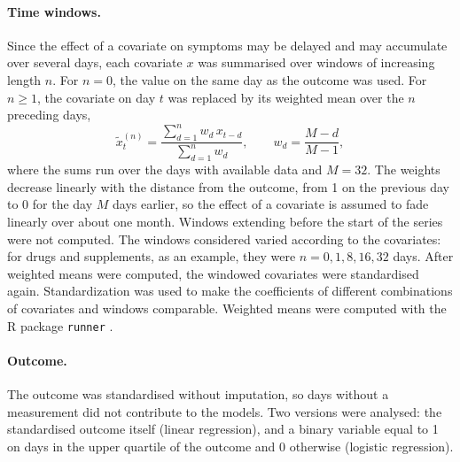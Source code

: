 \documentclass[11pt,a4paper]{article}
\begin{document}
\paragraph{Time windows.}
Since the effect of a covariate on symptoms may be delayed and may accumulate over
several days, each covariate $x$ was summarised over windows of increasing length
$n$. For $n=0$, the value on the same day as the outcome was used. For $n \geq 1$, the
covariate on day $t$ was replaced by its weighted mean over the $n$ preceding days,
\begin{equation}
  \tilde{x}^{(n)}_t = \frac{\sum_{d=1}^{n} w_d\, x_{t-d}}{\sum_{d=1}^{n} w_d},
  \qquad w_d = \frac{M-d}{M-1},
\end{equation}
where the sums run over the days with available data and $M = 32$. The weights
decrease linearly with the distance from the outcome, from 1 on the previous day to 0
for the day $M$ days earlier, so the effect of a covariate is assumed to fade linearly
over about one month. Windows extending before the start of the series were not
computed. The windows considered varied according to the covariates: for drugs and supplements, 
as an example, they were $n = 0, 1, 8, 16, 32$ days. After weighted means were computed,
the windowed covariates were standardised again. Standardization was used to make
the coefficients of different combinations of covariates and windows comparable. 
Weighted means were computed with the R package \texttt{runner} \citep{runner}.

\paragraph{Outcome.}
The outcome was standardised without imputation, so days without a measurement did
not contribute to the models. Two versions were analysed: the standardised outcome
itself (linear regression), and a binary variable equal to 1 on days in the upper
quartile of the outcome and 0 otherwise (logistic regression).
\end{document}
